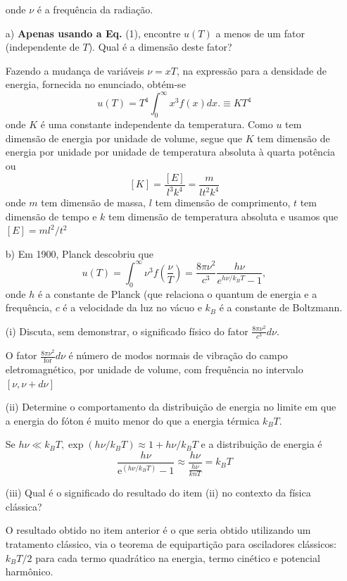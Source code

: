\begin{enumerate}[start=1,label={\bfseries Q\arabic*.}]
onde $\nu$ é a frequência da radiação.




a) \textbf{Apenas usando a Eq.} (1), encontre $u(T)$ a menos de um fator (independente de $T$). Qual é a dimensão deste fator?

\resposta  Fazendo a mudança de variáveis $\nu=x T$, na expressão para a densidade de energia, fornecida no enunciado, obtém-se
$$
u(T)=T^{4} \int_{0}^{\infty} x^{3} f(x) d x . \equiv K T^{4}
$$
onde $K$ é uma constante independente da temperatura. Como $u$ tem dimensão de energia por unidade de volume, segue que $K$ tem dimensão de energia por unidade por unidade de temperatura absoluta à quarta potência ou
$$
[K]=\frac{[E]}{l^{3} k^{4}}=\frac{m}{l t^{2} k^{4}}
$$
onde $m$ tem dimensão de massa, $l$ tem dimensão de comprimento, $t$ tem dimensão de tempo e
$k$ tem dimensão de temperatura absoluta e usamos que $[E]=m l^{2} / t^{2}$


b) Em 1900, Planck descobriu que
$$
u(T) = \int_{0}^{\infty} \nu^{3} f \left( \frac{\nu}{T} \right) = \frac{8 \pi \nu^{2}}{c^{3}} \frac{h\nu}{e^{h\nu / k_{B}T} - 1},
$$
onde $h$ é a constante de Planck (que relaciona o quantum de energia e a frequência, $c$ é a velocidade da luz no vácuo e $k_{B}$ é a constante de Boltzmann.



\item[(i)] Discuta, sem demonstrar, o significado físico do fator $\frac{8\pi \nu^{2}}{c^{3}} d \nu$.

\resposta O fator $\frac{8 \pi \nu^{2}}{\text { for }} d \nu$ é número de modos normais de vibração do campo eletromagnético, por unidade de volume, com frequência no intervalo $[\nu, \nu+d \nu]$


\item[(ii)] Determine o comportamento da distribuição de energia no limite em que a energia do fóton é muito menor do que a energia térmica $k_{B}T$.

\resposta Se $h \nu \ll k_{B} T, \exp \left(h \nu / k_{B} T\right) \approx 1+h \nu / k_{B} T$ e a distribuição de energia é
$$
\frac{h \nu}{\mathrm{e}^{\left(h \nu / k_{B} T\right)}-1} \approx \frac{h \nu}{\frac{h \nu}{k n T}}=k_{B} T
$$


\item[(iii)] Qual é o significado do resultado do item (ii) no contexto da física clássica?

\resposta O resultado obtido no item anterior é o que seria obtido utilizando um tratamento clássico,
via o teorema de equipartição para osciladores clássicos: $k_{B} T / 2$ para cada termo quadrático na energia, termo cinético e potencial harmônico.





\end{enumerate}
